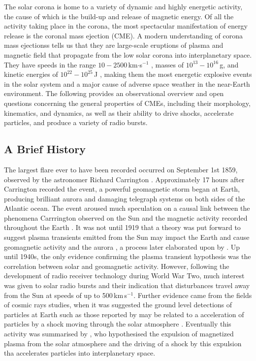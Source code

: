 The solar corona is home to a variety of dynamic and highly energetic activity, the cause of which is the build-up and release of magnetic energy. Of all the activity taking place in the corona, the most spectacular manifestation of energy release is the coronal mass ejection (CME). A modern understanding of corona mass ejectionss tells us that they are large-scale eruptions of plasma and magnetic field that propagate from the low solar corona into interplanetary space. They have speeds in the range $10-2500$\,km$\cdot$s$^{-1}$ \citep{gopal2004}, masses of $10^{13}-10^{16}$\,g, and kinetic energies of $10^{22} - 10^{25}$\,J \citep{vour2010}, making them the most energetic explosive events in the solar system and a major cause of adverse space weather in the near-Earth environment. The following provides an observational overview and open questions concerning the general properties of CMEs, including their morphology, kinematics, and dynamics, as well as their ability to drive shocks, accelerate particles, and produce a variety of radio bursts.

\subsection{A Brief History}\label{sec:20}

The largest flare ever to have been recorded occurred on September 1st 1859, observed by the astronomer Richard Carrington \citep{carrington1859}. Approximately 17 hours after Carrington recorded the event, a powerful geomagnetic storm began at Earth, producing brilliant aurora and damaging telegraph systems on both sides of the Atlantic ocean. The event aroused much speculation on a causal link between the phenomena Carrrington observed on the Sun and the magnetic activity recorded throughout the Earth \citep{balfour1861}. It was not until 1919 that a theory was put forward to suggest plasma transients emitted from the Sun may impact the Earth and cause geomagnetic activity and the aurora \citet{lindemann1919}, a process later elaborated upon by \citet{chapman1930}. Up until 1940s, the only evidence confirming the plasma transient hypothesis was the correlation between solar and geomagnetic activity. However, following the development of radio receiver technology during World War Two, much interest was given to solar radio bursts and their indication that disturbances travel away from the Sun at speeds of up to 500\,km\,s$^{-1}$\citep{wild1958}. Further evidence came from the fields of cosmic rays studies, when it was suggested the ground level detections of particles at Earth such as those reported by \citep{forbush1946} may be related to a acceleration of particles by a shock moving through the solar atmosphere \citep{wild1963}. Eventually this activity was summarised by \citet{gold1962}, who hypothesised the expulsion of magnetized plasma from the solar atmosphere and the driving of a shock by this expulsion tha accelerates particles into interplanetary space. 


